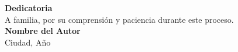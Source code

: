 
\thispagestyle{empty} %

\begin{center}
    \vspace*{2cm}

    {\Huge \textbf{Dedicatoria}} \\[1.5cm]
    
    {\large A familia, por su comprensión y paciencia durante este proceso.} \\[1.5cm]
    
    \vspace*{3cm}
    {\large \textbf{Nombre del Autor}} \\[1.0cm]
    {\large Ciudad, Año}

\end{center}

\vfill
\clearpage
